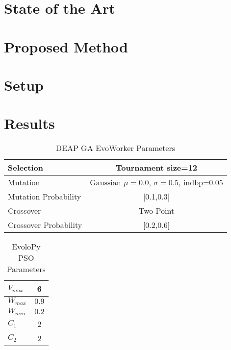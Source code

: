 \section{State of the Art}
\label{soa}

\section{Proposed Method}
\label{method}

\section{Setup}
\label{setup}

\section{Results}
\label{results}

\begin{table}
    \small
    \caption{ DEAP GA EvoWorker Parameters }
    \label{tab:GAparams} 
    \centering
    \small
    \begin{tabular}{|l|c|}
      \hline
      Selection & Tournament size=12                            \\ \hline
      Mutation & Gaussian $\mu=0.0$, $\sigma=0.5$, indbp=0.05   \\ \hline
      Mutation Probability & [0.1,0.3]                          \\ \hline
      Crossover & Two Point                                     \\ \hline
      Crossover Probability  & [0.2,0.6]                          \\ \hline
    \end{tabular}
  \end{table}
  
  \begin{table}
    \small
    \caption{ EvoloPy PSO Parameters }
    \label{tab:PSOparams} 
    \centering
    \small
    \begin{tabular}{|l|c|}
      \hline
      $V_{max}$ & 6 \\ \hline
      $W_{max}$ & $0.9$ \\ \hline
      $W_{min}$ & $0.2$ \\ \hline
      $C_1$ & 2 \\ \hline
      $C_2$ & 2 \\ \hline
    \end{tabular}
  \end{table}


